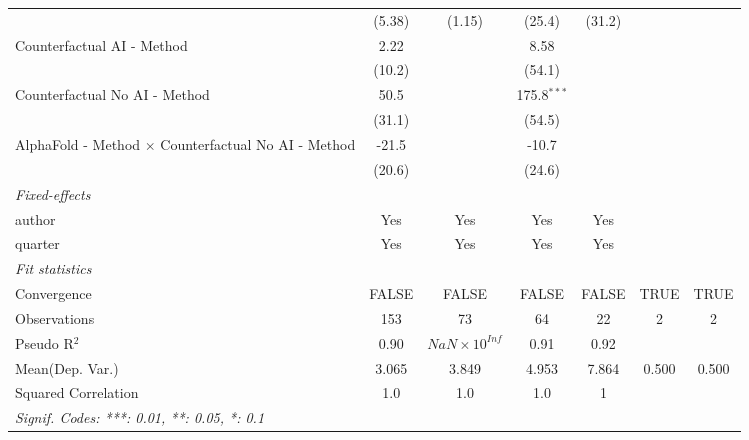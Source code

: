 \begin{tabular}{lcccccc}
                                                              & (5.38)   & (1.15)                & (25.4)        & (31.2)        &      &   \\   
   Counterfactual AI - Method                                 & 2.22     &                       & 8.58          &               &      &   \\   
                                                              & (10.2)   &                       & (54.1)        &               &      &   \\   
   Counterfactual No AI - Method                              & 50.5     &                       & 175.8$^{***}$ &               &      &   \\   
                                                              & (31.1)   &                       & (54.5)        &               &      &   \\   
   AlphaFold - Method $\times$ Counterfactual No AI - Method  & -21.5    &                       & -10.7         &               &      &   \\   
                                                              & (20.6)   &                       & (24.6)        &               &      &   \\   
   \midrule
   \emph{Fixed-effects}\\
   author                                                     & Yes      & Yes                   & Yes           & Yes           &      & \\  
   quarter                                                    & Yes      & Yes                   & Yes           & Yes           &      & \\  
   \midrule
   \emph{Fit statistics}\\
   Convergence                                                &FALSE     & FALSE                 & FALSE         & FALSE         & TRUE & TRUE\\  
   Observations                                               & 153      & 73                    & 64            & 22            & 2    & 2\\  
   Pseudo R$^2$                                               & 0.90     & $NaN\times 10^{Inf}$  & 0.91          & 0.92          &      & \\  
Mean(Dep. Var.) & 3.065 & 3.849 & 4.953 & 7.864 & 0.500 & 0.500 \\
   Squared Correlation                                        & 1.0      & 1.0                   & 1.0           & 1             &      & \\  
   \midrule \midrule
   \multicolumn{7}{l}{\emph{Signif. Codes: ***: 0.01, **: 0.05, *: 0.1}}\\
\end{tabular}
\par\endgroup

